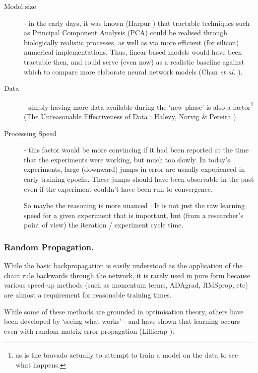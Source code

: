 \documentclass[citeauthoryear]{llncs}
\begin{document}
\begin{description}

\item[Model size] - in the early days, it was known (Harpur \cite{harpur-thesis}) 
that tractable techniques such as Principal Component Analysis (PCA) could be realised  
through biologically realistic processes, as well as via more efficient (for silicon) numerical implementations.  
Thus, linear-based models would have been tractable then, 
and could serve (even now) as a realistic baseline against which to compare 
more elaborate neural network models (Chan \emph{et al.} \cite{PCAnet}).

\item[Data] - simply having more data available during the `new phase' 
is also a factor\footnote{as is the bravado actually to attempt to train a model on the data to see what happens.}
(The Unreasonable Effectiveness of Data : Halevy, Norvig \& Pereira \cite{norvig-UnreasonableEffectivenessOfData}).

\item[Processing Speed] - this factor would be more convincing if it had been reported at the time 
that the experiments were working, but much too slowly.  
In today's experiments, large (downward) jumps in error are usually experienced in early training epochs.  
These jumps should have been observable in the past 
even if the experiment couldn't have been run to convergence.  

So maybe the reasoning is more nuanced : It is not just the raw learning speed 
for a given experiment that is important, but 
(from a researcher's point of view) the iteration / experiment cycle time.

\end{description}


\subsubsection*{Random Propagation.}

While the basic backpropagation is easily understood as the application 
of the chain rule backwards through the network, it is rarely used in pure form
because various speed-up methods (such as momentum terms, ADAgrad, RMSprop, etc)
are almost a requirement for reasonable training times.  

While some of these methods are grounded in optimisation theory, 
others have been developed by `seeing what works' - and have shown that 
learning occurs even with random matrix error propagation 
(Lillicrap \cite{Lillicrap-random-matrix}).  
\end{document}
